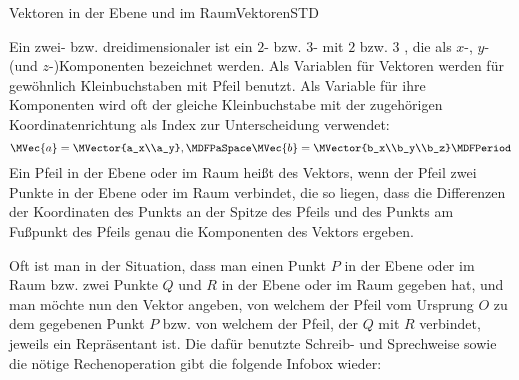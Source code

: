 \begin{MXContent}{Vektoren in der Ebene und im Raum}{Vektoren}{STD}
\begin{MInfo}
Ein zwei- bzw. dreidimensionaler  ist ein $2$- bzw. $3$- mit $2$ bzw. $3$ , die als $x$-, $y$- (und $z$-)Komponenten bezeichnet werden. Als Variablen für Vektoren werden für gewöhnlich Kleinbuchstaben mit Pfeil benutzt. Als Variable für ihre Komponenten wird oft der gleiche Kleinbuchstabe mit der zugehörigen Koordinatenrichtung als Index zur Unterscheidung verwendet: 
\[
 \MVec{a}=\MVector{a_x\\a_y},\MDFPaSpace \MVec{b}=\MVector{b_x\\b_y\\b_z}\MDFPeriod
\]
Ein Pfeil in der Ebene oder im Raum heißt  des Vektors, wenn der Pfeil zwei Punkte in der Ebene oder im Raum verbindet, die so liegen, dass die Differenzen der Koordinaten des Punkts an der Spitze des Pfeils und des Punkts am Fußpunkt des Pfeils genau die Komponenten des Vektors ergeben.  
\end{MInfo}

Oft ist man in der Situation, dass man einen Punkt $P$ in der Ebene oder im Raum bzw. zwei Punkte $Q$ und $R$ in der Ebene oder im Raum gegeben hat, und man möchte nun den Vektor angeben, von welchem der Pfeil vom Ursprung $O$ zu dem gegebenen Punkt $P$ bzw. von welchem der Pfeil, der $Q$ mit $R$ verbindet, jeweils ein Repräsentant ist. Die dafür benutzte Schreib- und Sprechweise sowie die nötige Rechenoperation gibt die folgende Infobox wieder:


\end{MXContent}
